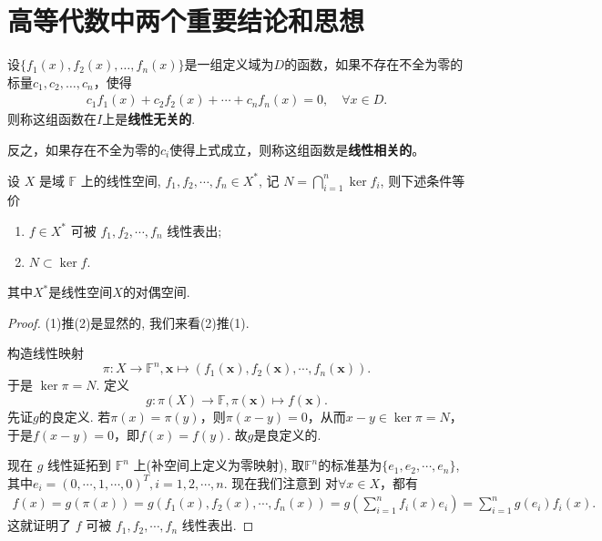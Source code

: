 \documentclass[../../main.tex]{subfiles}
\begin{document}
\section{高等代数中两个重要结论和思想}

\begin{definition}[函数组线性无关/相关]
设\(\{f_1(x), f_2(x), \ldots, f_n(x)\}\)是一组定义域为$D$的函数，如果不存在不全为零的标量\(c_1, c_2, \ldots, c_n\)，使得 
\begin{align*}
c_1 f_1(x) + c_2 f_2(x) + \cdots + c_n f_n(x) = 0,\quad \forall x\in D.
\end{align*}
则称这组函数在\(I\)上是\textbf{线性无关的}.

反之，如果存在不全为零的\(c_i\)使得上式成立，则称这组函数是\textbf{线性相关的}。
\end{definition}

\begin{theorem}\label{theorem:高等代数的重要结论1}
设 \( X \) 是域 \( \mathbb{F} \) 上的线性空间, \( f_1, f_2, \cdots, f_n \in X^* \), 记 \( N = \bigcap_{i=1}^n \ker f_i \), 则下述条件等价
\begin{enumerate}[(1)]
\item \( f \in X^* \) 可被 \( f_1, f_2, \cdots, f_n \) 线性表出;

\item \( N \subset \ker f \).
\end{enumerate}
其中$X^*$是线性空间$X$的对偶空间.
\end{theorem}
\begin{proof}
(1)推(2)是显然的, 我们来看(2)推(1).

构造线性映射
\[
\pi: X \to \mathbb{F}^n, \mathbf{x} \mapsto (f_1(\mathbf{x}), f_2(\mathbf{x}), \cdots, f_n(\mathbf{x})).
\]
于是 \( \ker \pi = N \). 定义
\[
g: \pi(X) \to \mathbb{F}, \pi(\mathbf{x}) \mapsto f(\mathbf{x}).
\]
先证$g$的良定义. 若$\pi(x) = \pi(y)$，则$\pi(x - y) = 0$，从而$x - y \in \ker \pi = N$，于是$f(x - y) = 0$，即$f(x) = f(y)$. 故$g$是良定义的.

现在 \( g \) 线性延拓到 \( \mathbb{F}^n \) 上(补空间上定义为零映射), 取$\mathbb{F}^n$的标准基为$\{e_1,e_2,\cdots,e_n\}$,其中$e_i=(0,\cdots,1,\cdots,0)^T,i=1,2,\cdots,n$.
现在我们注意到
对$\forall x \in X$，都有
\begin{align*}
f(x) = g(\pi(x)) = g(f_1(x), f_2(x), \cdots, f_n(x)) = g\left( \sum_{i=1}^n f_i(x) e_i \right) = \sum_{i=1}^n g(e_i) f_i(x).
\end{align*}
这就证明了 \( f \) 可被 \( f_1, f_2, \cdots, f_n \) 线性表出.

\end{proof}
\end{document}
